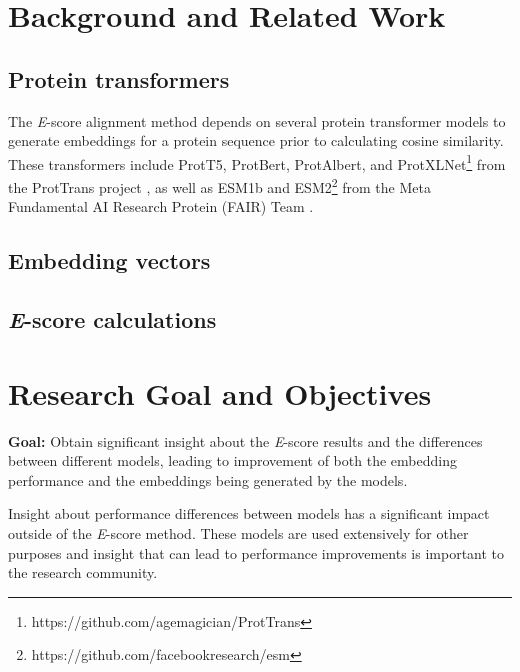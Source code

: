 \documentclass[
	letterpaper, %
	10pt, %
]{journalArticle}
\begin{document}
\section{Background and Related Work}

\subsection{Protein transformers}
The \textit{E}-score alignment method depends on several protein transformer models to generate embeddings for a protein sequence prior to calculating cosine similarity. These transformers include ProtT5, ProtBert, ProtAlbert, and ProtXLNet\footnote{https://github.com/agemagician/ProtTrans} from the ProtTrans project \autocite{Elnaggar:2021}, as well as ESM1b and ESM2\footnote{https://github.com/facebookresearch/esm} from the Meta Fundamental AI Research Protein (FAIR) Team \autocite{Rives:2021}.



\subsection{Embedding vectors}


\subsection{\textit{E}-score calculations}

\section{Research Goal and Objectives}
\textbf{Goal: }Obtain significant insight about the \textit{E}-score results and the differences between different models, leading to improvement of both the embedding performance and the embeddings being generated by the models.

Insight about performance differences between models has a significant impact outside of the \textit{E}-score method. These models are used extensively for other purposes and insight that can lead to performance improvements is important to the research community.

\end{document}
